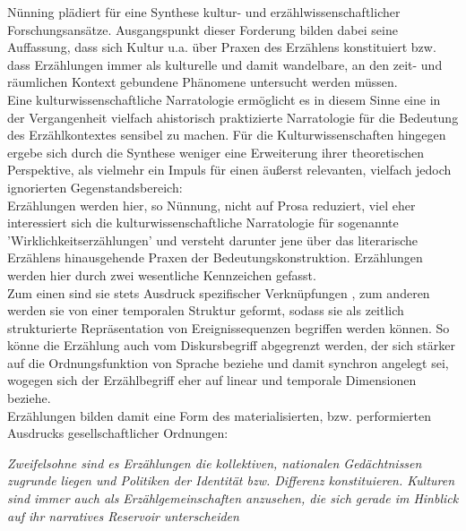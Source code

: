  Nünning plädiert für eine Synthese kultur-
und erzählwissenschaftlicher Forschungsansätze.\footnotemark {}
Ausgangspunkt dieser Forderung
bilden dabei seine Auffassung, dass sich Kultur u.a. über Praxen des Erzählens
konstituiert bzw. dass Erzählungen immer als kulturelle und damit wandelbare,
an den zeit- und räumlichen Kontext gebundene Phänomene untersucht werden
müssen. \\
Eine kulturwissenschaftliche Narratologie ermöglicht es in diesem Sinne
eine in der Vergangenheit vielfach ahistorisch praktizierte Narratologie für
die Bedeutung des Erzählkontextes sensibel zu machen. Für die
Kulturwissenschaften hingegen ergebe sich durch die Synthese weniger eine
Erweiterung ihrer theoretischen Perspektive, als vielmehr ein Impuls für einen
äußerst relevanten, vielfach jedoch ignorierten Gegenstandsbereich: \\
Erzählungen
werden hier, so Nünnung, nicht auf Prosa reduziert, viel eher interessiert sich
die kulturwissenschaftliche Narratologie für sogenannte
'Wirklichkeitserzählungen' und versteht darunter jene über das literarische
Erzählens hinausgehende Praxen der Bedeutungskonstruktion. Erzählungen werden
hier durch zwei wesentliche Kennzeichen gefasst. \\
Zum einen sind sie stets
Ausdruck \glqq spezifischer Verknüpfungen\grqq\footnotemark
{}, zum anderen werden sie von einer
\glqq temporalen Struktur\grqq\footnotemark {}  geformt, sodass sie als \glqq zeitlich strukturierte
Repräsentation von Ereignissequenzen\grqq\footnotemark {} begriffen werden können. So könne die
Erzählung auch vom Diskursbegriff abgegrenzt werden, der sich stärker auf die
Ordnungsfunktion von Sprache beziehe und damit synchron angelegt sei, wogegen
sich der Erzählbegriff eher auf linear und temporale Dimensionen
beziehe.\footnotemark {}\\
Erzählungen bilden damit eine Form des materialisierten, bzw. performierten
Ausdrucks gesellschaftlicher Ordnungen:
\begin{myenv}
  \textit{
  \glqq Zweifelsohne sind es Erzählungen die kollektiven, nationalen
  Gedächtnissen zugrunde liegen und Politiken der Identität bzw. Differenz
  konstituieren. Kulturen sind immer auch als Erzählgemeinschaften anzusehen,
  die sich gerade im Hinblick auf ihr narratives Reservoir unterscheiden\grqq\footnotemark {}
  } \end{myenv}
